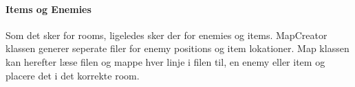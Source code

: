 \paragraph{Items og Enemies \\}
Som det sker for rooms, ligeledes sker der for enemies og items. MapCreator klassen
generer seperate filer for enemy positions og item lokationer. Map klassen 
kan herefter læse filen og mappe hver linje i filen til, en enemy eller item og 
placere det i det korrekte room.

